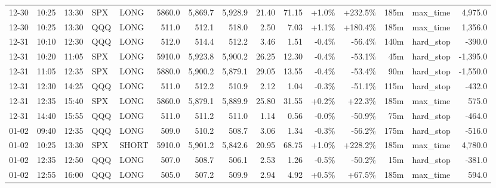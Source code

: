\documentclass[11pt,a4paper,twoside]{article}
\begin{document}
\begin{landscape}
\begin{center}
\begin{longtable}{>{\color{txtmain}}l l l l l r r r r r r r r >{\color{txtmain}}l r}
12-30 & 10:25 & 13:30 & SPX & LONG & 5860.0 & 5,869.7 & 5,928.9 & 21.40 & 71.15 & \textcolor{wingreen}{+1.0\%} & \textcolor{wingreen}{+232.5\%} & 185m & max\_time & \textcolor{wingreen}{4,975.0} \\
12-30 & 10:25 & 13:30 & QQQ & LONG & 511.0 & 512.1 & 518.0 & 2.50 & 7.03 & \textcolor{wingreen}{+1.1\%} & \textcolor{wingreen}{+180.4\%} & 185m & max\_time & \textcolor{wingreen}{1,356.0} \\
12-31 & 10:10 & 12:30 & QQQ & LONG & 512.0 & 514.4 & 512.2 & 3.46 & 1.51 & \textcolor{lossred}{-0.4\%} & \textcolor{lossred}{-56.4\%} & 140m & hard\_stop & \textcolor{lossred}{-390.0} \\
12-31 & 10:20 & 11:05 & SPX & LONG & 5910.0 & 5,923.8 & 5,900.2 & 26.25 & 12.30 & \textcolor{lossred}{-0.4\%} & \textcolor{lossred}{-53.1\%} & 45m & hard\_stop & \textcolor{lossred}{-1,395.0} \\
12-31 & 11:05 & 12:35 & SPX & LONG & 5880.0 & 5,900.2 & 5,879.1 & 29.05 & 13.55 & \textcolor{lossred}{-0.4\%} & \textcolor{lossred}{-53.4\%} & 90m & hard\_stop & \textcolor{lossred}{-1,550.0} \\
12-31 & 12:30 & 14:25 & QQQ & LONG & 511.0 & 512.2 & 510.9 & 2.12 & 1.04 & \textcolor{lossred}{-0.3\%} & \textcolor{lossred}{-51.1\%} & 115m & hard\_stop & \textcolor{lossred}{-432.0} \\
12-31 & 12:35 & 15:40 & SPX & LONG & 5860.0 & 5,879.1 & 5,889.9 & 25.80 & 31.55 & \textcolor{wingreen}{+0.2\%} & \textcolor{wingreen}{+22.3\%} & 185m & max\_time & \textcolor{wingreen}{575.0} \\
12-31 & 14:40 & 15:55 & QQQ & LONG & 511.0 & 511.2 & 511.0 & 1.14 & 0.56 & \textcolor{lossred}{-0.0\%} & \textcolor{lossred}{-50.9\%} & 75m & hard\_stop & \textcolor{lossred}{-464.0} \\
01-02 & 09:40 & 12:35 & QQQ & LONG & 509.0 & 510.2 & 508.7 & 3.06 & 1.34 & \textcolor{lossred}{-0.3\%} & \textcolor{lossred}{-56.2\%} & 175m & hard\_stop & \textcolor{lossred}{-516.0} \\
01-02 & 10:25 & 13:30 & SPX & SHORT & 5910.0 & 5,901.2 & 5,842.6 & 20.95 & 68.75 & \textcolor{wingreen}{+1.0\%} & \textcolor{wingreen}{+228.2\%} & 185m & max\_time & \textcolor{wingreen}{4,780.0} \\
01-02 & 12:35 & 12:50 & QQQ & LONG & 507.0 & 508.7 & 506.1 & 2.53 & 1.26 & \textcolor{lossred}{-0.5\%} & \textcolor{lossred}{-50.2\%} & 15m & hard\_stop & \textcolor{lossred}{-381.0} \\
01-02 & 12:55 & 16:00 & QQQ & LONG & 505.0 & 507.2 & 509.9 & 2.94 & 4.92 & \textcolor{wingreen}{+0.5\%} & \textcolor{wingreen}{+67.5\%} & 185m & max\_time & \textcolor{wingreen}{594.0} \\

\end{longtable}
\end{center}
\end{landscape}
\end{document}
